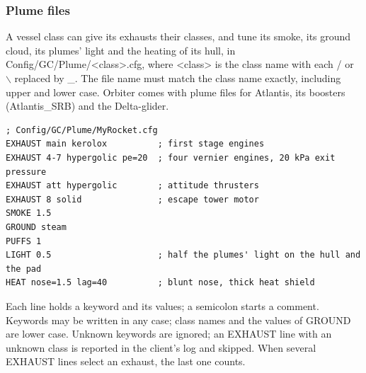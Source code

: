 \documentclass[Orbiter Developer Manual.tex]{subfiles}
\begin{document}
\begin{sloppypar}
\subsubsection{Plume files}
\label{sssec:vk_plumecfg}
A vessel class can give its exhausts their classes, and tune its smoke, its ground cloud, its plumes' light and the heating of its hull, in Config/GC/Plume/<class>.cfg, where <class> is the class name with each / or $\backslash$ replaced by \_. The file name must match the class name exactly, including upper and lower case. Orbiter comes with plume files for Atlantis, its boosters (Atlantis\_SRB) and the Delta-glider.

\begin{lstlisting}[language=OSFS]
; Config/GC/Plume/MyRocket.cfg
EXHAUST main kerolox          ; first stage engines
EXHAUST 4-7 hypergolic pe=20  ; four vernier engines, 20 kPa exit pressure
EXHAUST att hypergolic        ; attitude thrusters
EXHAUST 8 solid               ; escape tower motor
SMOKE 1.5
GROUND steam
PUFFS 1
LIGHT 0.5                     ; half the plumes' light on the hull and the pad
HEAT nose=1.5 lag=40          ; blunt nose, thick heat shield
\end{lstlisting}

\noindent
Each line holds a keyword and its values; a semicolon starts a comment. Keywords may be written in any case; class names and the values of GROUND are lower case. Unknown keywords are ignored; an EXHAUST line with an unknown class is reported in the client's log and skipped. When several EXHAUST lines select an exhaust, the last one counts.


\end{sloppypar}
\end{document}

